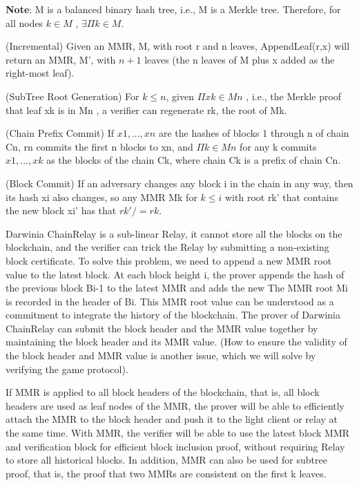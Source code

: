 \textbf{Note}: M is a balanced binary hash tree, i.e., M is a Merkle tree. Therefore, for all nodes $k \in M$ , $\exists \Pi k \in M $.

\begin{theorem}
(Incremental) Given an MMR, M, with root r and n leaves, AppendLeaf(r,x) will return an MMR, M’, with $n+1$ leaves (the n leaves of M plus x added as the right-most leaf).
\end{theorem}

\begin{theorem}
(SubTree Root Generation) For $k \leq n$, given $\Pi xk  \in Mn$ , i.e., the Merkle proof that leaf xk is in Mn , a verifier can regenerate rk, the root of Mk. 
\end{theorem}

\begin{corollary}
(Chain Prefix Commit) If $x1,...,xn$ are the hashes of blocks 1 through n of chain Cn, rn commits the first n blocks to xn, and $\Pi k \in Mn$ for any k commits $x1,...,xk$ as the blocks of the chain Ck, where chain Ck is a prefix of chain Cn.
\end{corollary}

\begin{corollary}
(Block Commit) If an adversary changes any block i in the chain in any way, then its hash xi also changes, so any MMR Mk for $k \leq i$ with root rk' that contains the new block xi' has that $rk' /= rk$.
\end{corollary}

Darwinia ChainRelay is a sub-linear Relay, it cannot store all the blocks on the blockchain, and the verifier can trick the Relay by submitting a non-existing block certificate. To solve this problem, we need to append a new MMR root value to the latest block. At each block height i, the prover appends the hash of the previous block Bi-1 to the latest MMR and adds the new The MMR root Mi is recorded in the header of Bi. This MMR root value can be understood as a commitment to integrate the history of the blockchain. The prover of Darwinia ChainRelay can submit the block header and the MMR value together by maintaining the block header and its MMR value. (How to ensure the validity of the block header and MMR value is another issue, which we will solve by verifying the game protocol).

If MMR is applied to all block headers of the blockchain, that is, all block headers are used as leaf nodes of the MMR, the prover will be able to efficiently attach the MMR to the block header and push it to the light client or relay at the same time. With MMR, the verifier will be able to use the latest block MMR and verification block for efficient block inclusion proof, without requiring Relay to store all historical blocks. In addition, MMR can also be used for subtree proof, that is, the proof that two MMRs are consistent on the first k leaves.

